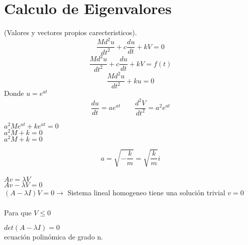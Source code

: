\chapter{Calculo de Eigenvalores}
(Valores y vectores propios carecteristicos).
\begin{displaymath}
\frac{Md^2u}{dt^2}+c\frac{du}{dt}+kV=0
\end{displaymath}
\begin{displaymath}
\frac{Md^2u}{dt^2}+c\frac{du}{dt}+kV=f(t)
\end{displaymath}
\begin{displaymath}
\frac{Md^2u}{dt^2}+ku=0
\end{displaymath}
Donde $u=e^{at}$
\begin{displaymath}
\frac{du}{dt}=ae^{at} \qquad \frac{d^2V}{dt^2}=a^2e^{at}
\end{displaymath}
\begin{center}
$a^2Me^{at}+ke^{at}=0$\\
$a^2M+k=0$\\
$a^2M+k=0$
\end{center}
\begin{displaymath}
a=\sqrt{-\frac{k}{m}}=\sqrt{\frac{k}{m}}i
\end{displaymath}
\\
$Av=\lambda V$\\
$Av-\lambda V=0$\\
$(A-\lambda I)V=0\rightarrow$ Sistema lineal homogeneo tiene una soluci\'on trivial $v=0$
\\
\\
Para que $V\leq 0$
\begin{center}
$det(A-\lambda I)=0$\\ecuaci\'on polin\'omica de grado n.
\end{center} 

